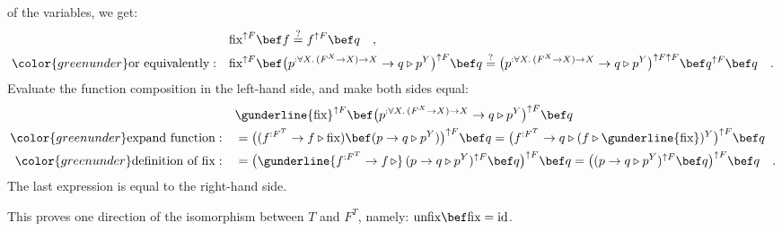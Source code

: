 of the variables, we get:
\begin{align*}
 & \text{fix}^{\uparrow F}\bef f\overset{?}{=}f^{\uparrow F}\bef q\quad,\\
{\color{greenunder}\text{or equivalently}:}\quad & \text{fix}^{\uparrow F}\bef\big(p^{:\forall X.\,(F^{X}\rightarrow X)\rightarrow X}\rightarrow q\triangleright p^{Y}\big)^{\uparrow F}\bef q\overset{?}{=}\big(p^{:\forall X.\,(F^{X}\rightarrow X)\rightarrow X}\rightarrow q\triangleright p^{Y}\big)^{\uparrow F\uparrow F}\bef q^{\uparrow F}\bef q\quad.
\end{align*}
Evaluate the function composition in the left-hand side, and make
both sides equal:
\begin{align*}
 & \gunderline{\text{fix}}^{\uparrow F}\bef\big(p^{:\forall X.\,(F^{X}\rightarrow X)\rightarrow X}\rightarrow q\triangleright p^{Y}\big)^{\uparrow F}\bef q\\
{\color{greenunder}\text{expand function}:}\quad & =\big((f^{:F^{T}}\rightarrow f\triangleright\text{fix})\bef(p\rightarrow q\triangleright p^{Y})\big)^{\uparrow F}\bef q=\big(f^{:F^{T}}\rightarrow q\triangleright(f\triangleright\gunderline{\text{fix}})^{Y}\big)^{\uparrow F}\bef q\\
{\color{greenunder}\text{definition of }\text{fix}:}\quad & =\big(\gunderline{f^{:F^{T}}\rightarrow f\,\triangleright}\,(p\rightarrow q\triangleright p^{Y})^{\uparrow F}\bef q\big)^{\uparrow F}\bef q=\big((p\rightarrow q\triangleright p^{Y})^{\uparrow F}\bef q\big)^{\uparrow F}\bef q\quad.
\end{align*}
The last expression is equal to the right-hand side.

This proves one direction of the isomorphism between $T$ and $F^{T}$,
namely: $\text{unfix}\bef\text{fix}=\text{id}$.

